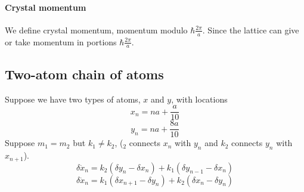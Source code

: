 \paragraph{Crystal momentum}
We define crystal momentum, momentum modulo $\hbar\frac{2\pi}{a}$. Since the lattice can give or take momentum in portions $\hbar\frac{2\pi}{a}$.
\subsection{Two-atom chain of atoms}
Suppose we have two types of atoms, $x$ and $y$, with locations
$$x_n  = na+\frac{a}{10}$$
$$y_n  = na+\frac{8a}{10}$$
Suppose $m_1=m_2$ but $k_1\neq k_2$, ($_2$ connects $x_n$ with $y_n$ and $k_2$ connects $y_n$ with $x_{n+1}$).
$$\delta \ddot{x}_n = k_2(\delta y_n - \delta x_n) + k_1(\delta y_{n-1} - \delta x_n)$$
$$\delta \ddot{x}_n =k_1(\delta x_{n+1} - \delta y_{n}) + k_2(\delta x_n - \delta y_n ) $$